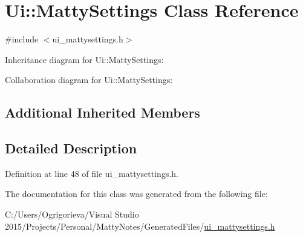 \hypertarget{classUi_1_1MattySettings}{}\section{Ui\+:\+:Matty\+Settings Class Reference}
\label{classUi_1_1MattySettings}


{\ttfamily \#include $<$ui\+\_\+mattysettings.\+h$>$}



Inheritance diagram for Ui\+:\+:Matty\+Settings\+:


Collaboration diagram for Ui\+:\+:Matty\+Settings\+:
\subsection*{Additional Inherited Members}


\subsection{Detailed Description}


Definition at line 48 of file ui\+\_\+mattysettings.\+h.



The documentation for this class was generated from the following file\+:\begin{DoxyCompactItemize}
\item 
C\+:/\+Users/\+Ogrigorieva/\+Visual Studio 2015/\+Projects/\+Personal/\+Matty\+Notes/\+Generated\+Files/\hyperlink{ui__mattysettings_8h}{ui\+\_\+mattysettings.\+h}\end{DoxyCompactItemize}
